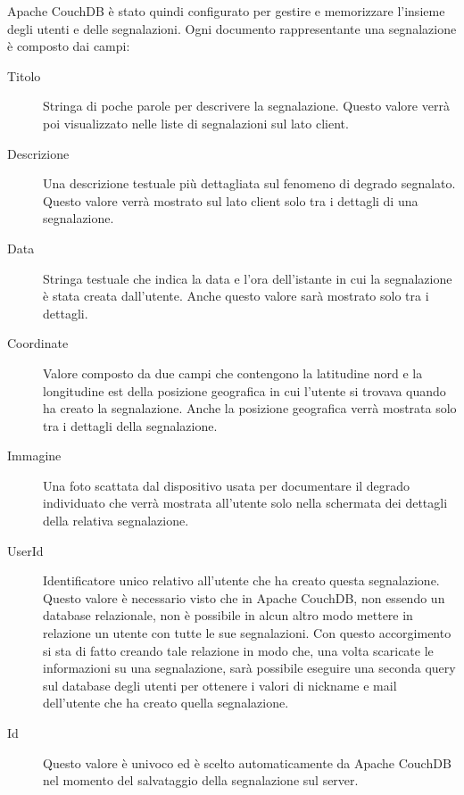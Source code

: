         \noindent Apache CouchDB\texttrademark{} è stato quindi configurato per gestire e
        memorizzare l'insieme degli utenti e delle segnalazioni.
        Ogni documento rappresentante una segnalazione è composto dai campi:
        \begin{description}
            \item[Titolo] Stringa di poche parole per descrivere la segnalazione.
                Questo valore verrà poi visualizzato nelle liste di segnalazioni
                sul lato client.
            \item[Descrizione] Una descrizione testuale più dettagliata sul
                fenomeno di degrado segnalato. Questo valore verrà mostrato sul
                lato client solo tra i dettagli di una segnalazione.
            \item[Data] Stringa testuale che indica la data e l'ora dell'istante
                in cui la segnalazione è stata creata dall'utente. Anche questo
                valore sarà mostrato solo tra i dettagli.
            \item[Coordinate] Valore composto da due campi che contengono la
                latitudine nord e la longitudine est della posizione geografica
                in cui l'utente si trovava quando ha creato la segnalazione. Anche
                la posizione geografica verrà mostrata solo tra i dettagli della
                segnalazione.
            \item[Immagine] Una foto scattata dal dispositivo usata per
                documentare il degrado individuato che verrà mostrata all'utente
                solo nella schermata dei dettagli della relativa segnalazione.
            \item[UserId] Identificatore unico relativo all'utente che ha creato
                questa segnalazione. Questo valore è necessario visto che in
                Apache CouchDB\texttrademark{}, non essendo un database relazionale,
                non è possibile in alcun altro modo mettere in relazione un utente con
                tutte le sue segnalazioni. Con questo accorgimento si sta di fatto
                creando tale relazione in modo che, una volta scaricate le
                informazioni su una segnalazione, sarà possibile eseguire una
                seconda query sul database degli utenti per ottenere i valori
                di nickname e mail dell'utente che ha creato quella segnalazione.
            \item[Id] Questo valore è univoco ed è scelto automaticamente da
                Apache CouchDB\texttrademark{} nel momento del
                salvataggio della segnalazione sul server.
        \end{description}

